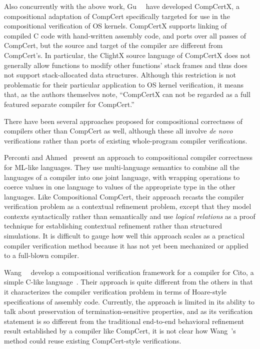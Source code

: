 Also concurrently with the above work, Gu~\etal~\cite{gu+:popl2015} have
developed CompCertX, a compositional adaptation of CompCert
specifically targeted for use in the compositional verification of OS
kernels.  CompCertX supports linking of compiled C code with
hand-written assembly code, and ports over all passes of CompCert, but
the source and target of the compiler are different from CompCert's.
In particular, the ClightX source language of CompCertX does not
generally allow functions to modify other functions' stack frames and
thus does not support stack-allocated data structures.  Although this
restriction is not problematic for their particular application to OS
kernel verification, it means that, as the authors themselves note,
``CompCertX can not be regarded as a full featured separate compiler
for CompCert.''

There have been several approaches proposed for compositional
correctness of compilers other than CompCert as well, although these
all involve \emph{de novo} verifications rather than ports of existing
whole-program compiler verifications.

Perconti and Ahmed~\cite{perconti+:esop14}  present an approach to compositional
compiler correctness for ML-like languages.  They use multi-language
semantics to combine all the languages of a compiler into one joint
language, with wrapping operations to coerce values in one language to
values of the appropriate type in the other languages.  Like
Compositional CompCert, their approach recasts the compiler
verification problem as a contextual refinement problem, except that
they model contexts syntactically rather than semantically and use
\emph{logical relations} as a proof technique for establishing
contextual refinement rather than structured simulations.  It is
difficult to gauge how well this approach scales as a practical
compiler verification method because it has not yet been mechanized or
applied to a full-blown compiler.

Wang~\etal~\cite{cito} develop a compositional verification framework
for a compiler for Cito, a simple C-like language~\cite{cito}.  Their
approach is quite different from the others in that it characterizes
the compiler verification problem in terms of Hoare-style
specifications of assembly code.  Currently, the approach is limited
in its ability to talk about preservation of termination-sensitive
properties, and as its verification statement is so different from the
traditional end-to-end behavioral refinement result established by a
compiler like \mbox{CompCert}, it is not clear how Wang~\etal's method
could reuse existing CompCert-style verifications.

